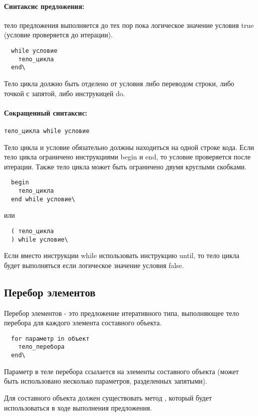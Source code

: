 \paragraph*{Синтаксис предложения:} тело предложения выполняется до тех пор пока логическое значение условия true (условие проверяется до итерации).

\begin{verbatim}
  while условие
    тело_цикла
  end\
\end{verbatim}

Тело цикла должно быть отделено от условия либо переводом строки, либо точкой с запятой, либо инструкицей do.

\paragraph*{Сокращенный синтаксис:} \verb!тело_цикла while условие!

Тело цикла и условие обязательно должны находиться на одной строке кода. Если тело цикла ограничено инструкциями begin и end, то условие проверяется после итерации. Также тело цикла может быть ограничено двумя круглыми скобками.
\begin{verbatim}
  begin 
    тело_цикла
  end while условие\
\end{verbatim}
или
\begin{verbatim}
  ( тело_цикла
  ) while условие\
\end{verbatim}
	
Если вместо инструкции while использовать инструкцию until, то тело цикла будет выполняться если логическое значение условия false. 

\subsection{Перебор элементов}

Перебор элементов - это предложение итеративного типа, выполняющее тело перебора для каждого элемента составного объекта.
\begin{verbatim}
  for параметр in объект
    тело_перебора
  end\
\end{verbatim}

Параметр в теле перебора ссылается на элементы составного объекта (может быть использовано несколько параметров, разделенных запятыми).

Для составного объекта должен существовать метод , который будет использоваться в ходе выполнения предложения.

